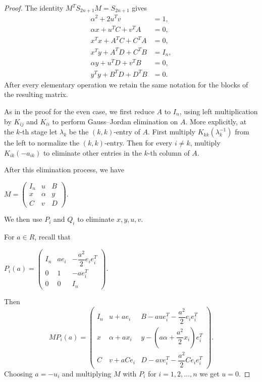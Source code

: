 \documentclass[11pt]{amsart}
\theoremstyle{definition}
\theoremstyle{remark}
\theoremstyle{remark}
\begin{document}
\begin{proof}
The identity $M^T S_{2n+1} M= S_{2n+1}$ gives
\begin{align}
\alpha^2+2u^Tv&=1,                                   \label{equa-odd-gj-1}
\\
\alpha x+u^TC+v^TA&=0,                                  \label{equa-odd-gj-2}\\
x^Tx+A^TC+C^TA&=0,                                      \label{equa-odd-gj-3}\\
x^Ty+A^TD+C^TB&=I_n,                                    \label{equa-odd-gj-4}\\
\alpha y+u^TD+v^TB&=0,                                  \label{equa-odd-gj-5}\\
y^Ty+B^TD+D^TB&=0.    \nonumber                                  \label{equa-odd-gj-6}
\end{align}
After every elementary operation we retain the same notation for
the blocks of the resulting matrix.


As in the proof for the even case, we first reduce $A$ to $I_n$, using left multiplication by
$K_{ij}$ and $K_{ii}$ to perform 
Gauss--Jordan elimination on $A$.
More explicitly, at the $k$-th stage let $\lambda_k$ be the 
$(k,k)$-entry of $A$. First multiply $K_{kk}(\lambda_k^{-1})$ from the left
to normalize the  $(k,k)$-entry. Then for every $i\neq k$, multiply $K_{ik}(-a_{ik})$ to eliminate other entries in the $k$-th column of $A$. 

After this elimination process, we have
\begin{center}
$M=
\begin{pmatrix}
I_n&u&B\\
x&\alpha&y\\
C&v&D
\end{pmatrix}.$
\end{center}

We then use $P_{i}$ and $Q_{i}$ to eliminate $x,y,u,v$. 

For $a\in R$, recall that
\begin{center}
$P_i(a)=
\begin{pmatrix}
I_n&ae_i&-\dfrac{a^2}{2}e_ie_i^T\\
0&1&-ae_i^T\\
0&0&I_n
\end{pmatrix}.$
\end{center}
Then
\begin{equation*}
MP_i(a)=
\begin{pmatrix}
I_n
&
u+ae_i
&
B-au e_i^T-\dfrac{a^2}{2}e_ie_i^T
\\
x
&
\alpha+ax_i
&
y-\left(a\alpha+\dfrac{a^2}{2}x_i\right)e_i^T
\\
C
&
v+aCe_i
&
D-av e_i^T-\dfrac{a^2}{2}Ce_ie_i^T
\end{pmatrix}.
\end{equation*}
Choosing $a = - u_i$ and multiplying $M$ with $P_i$ for $i = 1, 2, \dots, n$ we get $u=0$. 


\end{proof}
\end{document}
